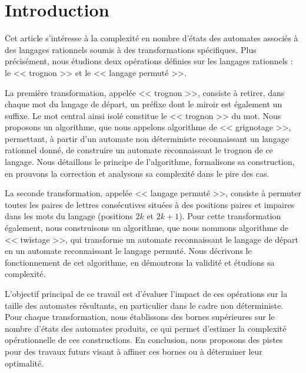 \section{Introduction}

Cet article s'intéresse à la complexité en nombre d'états des automates
associés à des langages rationnels soumis à des transformations spécifiques.
Plus précisément, nous étudions deux opérations définies sur les langages
rationnels : le << trognon >> et le << langage permuté >>.

\vphantom{}

La première transformation, appelée << trognon >>, consiste à retirer, dans
chaque mot du langage de départ, un préfixe dont le miroir est également un
suffixe. Le mot central ainsi isolé constitue le << trognon >> du mot. Nous
proposons un algorithme, que nous appelons algorithme de << grignotage >>,
permettant, à partir d’un automate non déterministe reconnaissant un langage
rationnel donné, de construire un automate reconnaissant le trognon de ce
langage. Nous détaillons le principe de l’algorithme, formalisons sa
construction, en prouvons la correction et analysons sa complexité dans le
pire des cas.

\vphantom{}

La seconde transformation, appelée << langage permuté >>, consiste à permuter
toutes les paires de lettres consécutives situées à des positions paires et
impaires dans les mots du langage (positions \(2k\) et \(2k + 1\)). Pour cette
transformation également, nous construisons un algorithme, que nous nommons
algorithme de << twistage >>, qui transforme un automate reconnaissant le
langage de départ en un automate reconnaissant le langage permuté. Nous
décrivons le fonctionnement de cet algorithme, en démontrons la validité et
étudions sa complexité.

\vphantom{}

L’objectif principal de ce travail est d’évaluer l’impact de ces opérations
sur la taille des automates résultants, en particulier dans le cadre non
déterministe. Pour chaque transformation, nous établissons des bornes
supérieures sur le nombre d’états des automates produits, ce qui permet
d’estimer la complexité opérationnelle de ces constructions. En conclusion,
nous proposons des pistes pour des travaux futurs visant à affiner ces bornes
ou à déterminer leur optimalité.
